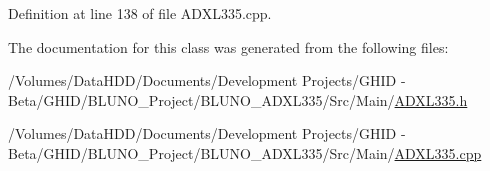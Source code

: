 \-Definition at line 138 of file \-A\-D\-X\-L335.\-cpp.



\-The documentation for this class was generated from the following files\-:\begin{DoxyCompactItemize}
\item 
/\-Volumes/\-Data\-H\-D\-D/\-Documents/\-Development Projects/\-G\-H\-I\-D -\/ Beta/\-G\-H\-I\-D/\-B\-L\-U\-N\-O\-\_\-\-Project/\-B\-L\-U\-N\-O\-\_\-\-A\-D\-X\-L335/\-Src/\-Main/\hyperlink{_a_d_x_l335_8h}{\-A\-D\-X\-L335.\-h}\item 
/\-Volumes/\-Data\-H\-D\-D/\-Documents/\-Development Projects/\-G\-H\-I\-D -\/ Beta/\-G\-H\-I\-D/\-B\-L\-U\-N\-O\-\_\-\-Project/\-B\-L\-U\-N\-O\-\_\-\-A\-D\-X\-L335/\-Src/\-Main/\hyperlink{_a_d_x_l335_8cpp}{\-A\-D\-X\-L335.\-cpp}\end{DoxyCompactItemize}
